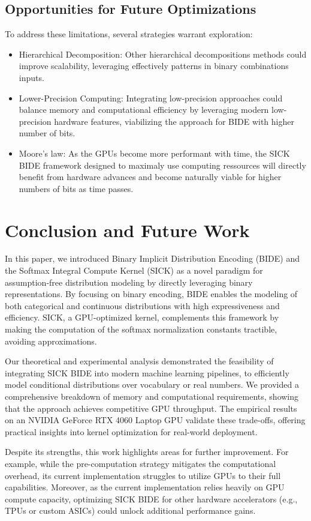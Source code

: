\documentclass{article}
\begin{document}
\subsection{Opportunities for Future Optimizations}
To address these limitations, several strategies warrant exploration:

\begin{itemize}
\item Hierarchical Decomposition: Other hierarchical decompositions methods could improve scalability, leveraging effectively patterns in binary combinations inputs.
\item Lower-Precision Computing: Integrating low-precision approaches could balance memory and computational efficiency by leveraging modern low-precision hardware features, viabilizing the approach for BIDE with higher number of bits.
\item Moore's law: As the GPUs become more performant with time, the SICK BIDE framework designed to maximaly use computing ressources will directly benefit from hardware advances and become naturally viable for higher numbers of bits as time passes.
\end{itemize}

\section{Conclusion and Future Work}
In this paper, we introduced Binary Implicit Distribution Encoding (BIDE) and the Softmax Integral Compute Kernel (SICK) as a novel paradigm for assumption-free distribution modeling by directly leveraging binary representations. By focusing on binary encoding, BIDE enables the modeling of both categorical and continuous distributions with high expressiveness and efficiency. SICK, a GPU-optimized kernel, complements this framework by making the computation of the softmax normalization constants tractible, avoiding approximations.

Our theoretical and experimental analysis demonstrated the feasibility of integrating SICK BIDE into modern machine learning pipelines, to efficiently model conditional distributions over vocabulary or real numbers. We provided a comprehensive breakdown of memory and computational requirements, showing that the approach achieves competitive GPU throughput. The empirical results on an NVIDIA GeForce RTX 4060 Laptop GPU validate these trade-offs, offering practical insights into kernel optimization for real-world deployment.

Despite its strengths, this work highlights areas for further improvement. For example, while the pre-computation strategy mitigates the computational overhead, its current implementation struggles to utilize GPUs to their full capabilities. Moreover, as the current implementation relies heavily on GPU compute capacity, optimizing SICK BIDE for other hardware accelerators (e.g., TPUs or custom ASICs) could unlock additional performance gains.
\end{document}
